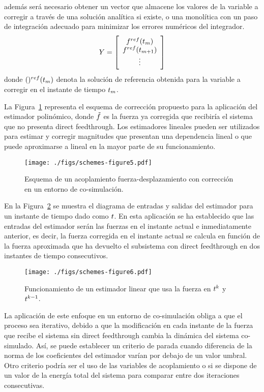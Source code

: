además será necesario obtener un vector que almacene los valores de la variable a corregir a través de una solución analítica si existe, o una monolítica con un paso de integración adecuado para minimizar los errores numéricos del integrador.
%
\begin{equation}
    \estimated = \sqbr{\matr{c}
    {\forceMod^{ref} (t_m) \\ \forceMod^{ref} (t_{m+1}) \\ \vdots}} 
\end{equation}
%
donde $()^{ref} (\ctime_m)$ denota la solución de referencia obtenida para la variable a corregir en el instante de tiempo $\ctime_m$.

La Figura~\ref{fig:FScorr} representa el esquema de corrección propuesto para la aplicación del estimador polinómico, donde $\forceCorr$ es la fuerza ya corregida que recibiría el sistema que no presenta direct feedthrough. 
Los estimadores lineales pueden ser utilizados para estimar y corregir magnitudes que presentan una dependencia lineal o que puede aproximarse a lineal en la mayor parte de su funcionamiento.

\begin{figure}[ht!]\centering
	\texttt{[image: ./figs/schemes-figure5.pdf]}
	\caption{Esquema de un acoplamiento fuerza-desplazamiento con corrección en un entorno de co-simulación.}
	\label{fig:FScorr}
\end{figure}

En la Figura~\ref{fig:Estimador} se muestra el diagrama de entradas y salidas del estimador para un instante de tiempo dado como $\ctime$. 
En esta aplicación se ha establecido que las entradas del estimador serán las fuerzas en el instante actual e inmediatamente anterior, es decir, la fuerza corregida en el instante actual se calcula en función de la fuerza aproximada que ha devuelto el subsistema con direct feedthrough en dos instantes de tiempo consecutivos.

\begin{figure}[ht!]\centering
	\texttt{[image: ./figs/schemes-figure6.pdf]}
	\caption{Funcionamiento de un estimador linear que usa la fuerza en $\ctime^{\step}$ y $\ctime^{\step - 1}$.}
	\label{fig:Estimador}
\end{figure}

La aplicación de este enfoque en un entorno de co-simulación obliga a que el proceso sea iterativo, debido a que la modificación en cada instante de la fuerza que recibe el sistema sin direct feedthrough cambia la dinámica del sistema co-simulado.
Así, se puede establecer un criterio de parada cuando diferencia de la norma de los coeficientes del estimador varían por debajo de un valor umbral. Otro criterio podría ser el uso de las variables de acoplamiento o si se dispone de un valor de la energía total del sistema para comparar entre dos iteraciones consecutivas.

